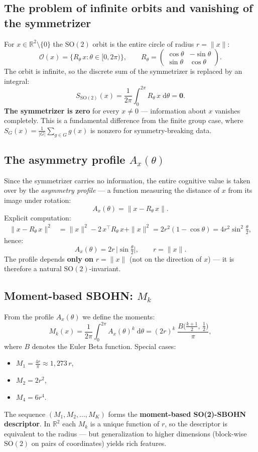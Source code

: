 \documentclass[11pt,a4paper]{report}
\begin{document}
\subsection{The problem of infinite orbits and vanishing of the symmetrizer}

For $x\in\mathbb{R}^2\setminus\{0\}$ the $\mathrm{SO}(2)$ orbit is the entire circle of radius $r=\|x\|$:
\[
  \mathcal{O}(x)=\{R_\theta\, x:\theta\in[0,2\pi)\},
  \qquad
  R_\theta=\begin{pmatrix}\cos\theta&-\sin\theta\\\sin\theta&\cos\theta\end{pmatrix}.
\]
The orbit is infinite, so the discrete sum of the symmetrizer is replaced by an integral:
\[
  S_{\mathrm{SO}(2)}(x)
  =\frac{1}{2\pi}\int_0^{2\pi}R_\theta\,x\;\mathrm{d}\theta
  =\mathbf{0}.
\]
\textbf{The symmetrizer is zero} for every $x\neq 0$ --- information about $x$ vanishes completely. This is a fundamental difference from the finite group case, where $S_G(x)=\tfrac{1}{|G|}\sum_{g\in G}g(x)$ is nonzero for symmetry-breaking data.

\subsection{The asymmetry profile $A_x(\theta)$}

Since the symmetrizer carries no information, the entire cognitive value is taken over by the \emph{asymmetry profile} --- a function measuring the distance of $x$ from its image under rotation:
\[
  A_x(\theta)=\|x-R_\theta\,x\|.
\]
Explicit computation:
\begin{align*}
  \|x-R_\theta\,x\|^2
  &=\|x\|^2-2\,x^\top R_\theta\,x+\|x\|^2
  =2r^2(1-\cos\theta)
  =4r^2\sin^2\!\tfrac{\theta}{2},
\end{align*}
hence:
\[
  \boxed{A_x(\theta)=2r\,\bigl|\sin\tfrac{\theta}{2}\bigr|},
  \qquad r=\|x\|.
\]
The profile depends \textbf{only on} $r=\|x\|$ (not on the direction of $x$) --- it is therefore a natural $\mathrm{SO}(2)$-invariant.

\subsection{Moment-based SBOHN: $M_k$}

From the profile $A_x(\theta)$ we define the moments:
\[
  M_k(x)=\frac{1}{2\pi}\int_0^{2\pi}A_x(\theta)^k\;\mathrm{d}\theta
  =(2r)^k\;\frac{B\!\bigl(\frac{k+1}{2},\,\frac{1}{2}\bigr)}{\pi},
\]
where $B$ denotes the Euler Beta function. Special cases:
\begin{itemize}
  \item $M_1 = \frac{4r}{\pi}\approx 1{,}273\,r$,
  \item $M_2 = 2r^2$,
  \item $M_4 = 6r^4$.
\end{itemize}
The sequence $(M_1,M_2,\ldots,M_K)$ forms the \textbf{moment-based SO(2)-SBOHN descriptor}. In $\mathbb{R}^2$ each $M_k$ is a unique function of $r$, so the descriptor is equivalent to the radius --- but generalization to higher dimensions (block-wise $\mathrm{SO}(2)$ on pairs of coordinates) yields rich features.
\end{document}
